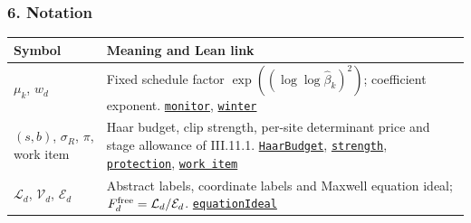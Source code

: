 \documentclass[
  letterpaper,
  11pt]{article}
\newcounter{none} %
\begin{document}
\subsubsection{6. Notation}\label{notation-13}

{\def\LTcaptype{none} %
\begin{longtable}[]{@{}
  >{\raggedright\arraybackslash}p{}
  >{\raggedright\arraybackslash}p{}@{}}
\toprule\noalign{}
\begin{minipage}[b]{\linewidth}\raggedright
Symbol
\end{minipage} & \begin{minipage}[b]{\linewidth}\raggedright
Meaning and Lean link
\end{minipage} \\
\midrule\noalign{}
\endhead
\bottomrule\noalign{}
\endlastfoot
\(\mu_k\), \(w_d\) & Fixed schedule factor
\(\exp((\log\log\hat\beta_k)^2)\); coefficient exponent.
\href{https://github.com/yang-mills-group/OpenAI-YM-20261028/blob/3456e5e75cf8d4cd558955a5c7638fba2d68f464/YM/RG/History.lean\#L81}{\texttt{monitor}},
\href{https://github.com/yang-mills-group/OpenAI-YM-20261028/blob/3456e5e75cf8d4cd558955a5c7638fba2d68f464/YM/MergeProof/Tender.lean\#L11}{\texttt{winter}} \\
\((s,b)\), \(\sigma_R\), \(\pi\), work item & Haar budget, clip
strength, per-site determinant price and stage allowance of III.11.1.
\href{https://github.com/yang-mills-group/OpenAI-YM-20261028/blob/3456e5e75cf8d4cd558955a5c7638fba2d68f464/YM/Next/RANK/Determinant.lean\#L26-L33}{\texttt{HaarBudget}},
\href{https://github.com/yang-mills-group/OpenAI-YM-20261028/blob/3456e5e75cf8d4cd558955a5c7638fba2d68f464/YM/Next/RANK/Determinant.lean\#L116}{\texttt{strength}},
\href{https://github.com/yang-mills-group/OpenAI-YM-20261028/blob/3456e5e75cf8d4cd558955a5c7638fba2d68f464/YM/Next/RANK/Determinant.lean\#L225-L227}{\texttt{protection}},
\href{https://github.com/yang-mills-group/OpenAI-YM-20261028/blob/3456e5e75cf8d4cd558955a5c7638fba2d68f464/YM/Next/RANK/StationMeter.lean\#L41-L44}{\texttt{work\ item}} \\
\(\mathcal L_d\), \(\mathcal V_d\), \(\mathcal E_d\) & Abstract labels,
coordinate labels and Maxwell equation ideal;
\(F_d^{\rm free}=\mathcal L_d/\mathcal E_d\).
\href{https://github.com/yang-mills-group/OpenAI-YM-20261028/blob/3456e5e75cf8d4cd558955a5c7638fba2d68f464/YM/Maxwell/Equation.lean\#L72}{\texttt{equationIdeal}} \\

\end{longtable}}
\end{document}
